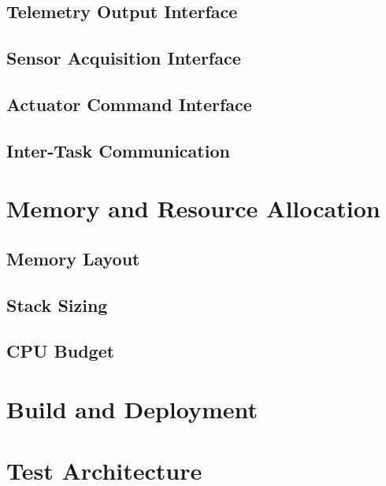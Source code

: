 \documentclass{article}
\begin{document}
        \subsection{Telemetry Output Interface}\label{ssec:telemetry-interface}

        \subsection{Sensor Acquisition Interface}\label{ssec:sensor-interface}

        \subsection{Actuator Command Interface}\label{ssec:actuator-interface}

        \subsection{Inter-Task Communication}\label{ssec:inter-task-comm}

    \section{Memory and Resource Allocation}\label{sec:memory-layout}

        \subsection{Memory Layout}\label{ssec:memory-layout}

        \subsection{Stack Sizing}\label{ssec:stack-sizing}

        \subsection{CPU Budget}\label{ssec:cpu-budget}

    \section{Build and Deployment}\label{sec:build-and-deployment}

    \section{Test Architecture}\label{sec:test-architecture}
\end{document}
